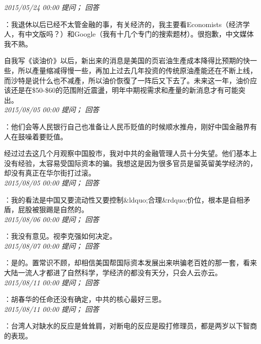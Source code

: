 \documentclass[twocolumn]{ctexart}
\begin{document}
\textit{\hfill\noindent\small 2015/05/24 00:00 提问； 回答}

：我退休以后已经不太管金融的事，有关经济的，我主要看Economists（经济学人，有中文版吗？）和Google（我有十几个专门的搜索题材）。很抱歉，中文媒体我不熟。

自我写《谈油价》以后，新出来的消息是美国的页岩油生產成本降得比预期的快一些，所以產量缩减得慢一些，再加上过去几年投资的传统原油產能还在不断上线，而沙特是说什么也不减產，所以油价恢復了一阵后又下去了。未来这一年，油价应该还是在\$50-\$60的范围附近震盪，明年中期视需求和產量的新消息才有可能突出。\\

\textit{\hfill\noindent\small 2015/08/05 00:00 提问； 回答}

：他们会等人民银行自己也准备让人民币贬值的时候顺水推舟，刚好中国金融界有人在鼓噪着要贬值。

经过过去这几个月观察中国股市，我对中共的金融管理人员十分失望。他们基本上没有经验，太容易受国际资本的骗。我想这是因为很多官员是留英留美学经济的，却没有真正在华尔街打过滚。\\

\textit{\hfill\noindent\small 2015/08/05 00:00 提问； 回答}

：我的看法是中国又要流动性又要控制\&ldquo;合理\&rdquo;价位，根本是自相矛盾，屁股被狠踢是自然的。\\

\textit{\hfill\noindent\small 2015/08/06 00:00 提问； 回答}

：我没有意见。视李克强如何决定。\\

\textit{\hfill\noindent\small 2015/08/07 00:00 提问； 回答}

：是的。置常识不顾，却相信美国帮国际资本发展出来哄骗老百姓的那一套，看来大陆一流人才都进了自然科学，学经济的都没有天分，只会人云亦云。\\

\textit{\hfill\noindent\small 2015/08/11 00:00 提问； 回答}

：胡春华的任命还没有确定，中共的核心最好三思。\\

\textit{\hfill\noindent\small 2015/08/11 00:00 提问； 回答}

：台湾人对缺水的反应是耸耸肩，对断电的反应是殴打修理员，都是两岁以下智商的表现。\\
\end{document}
